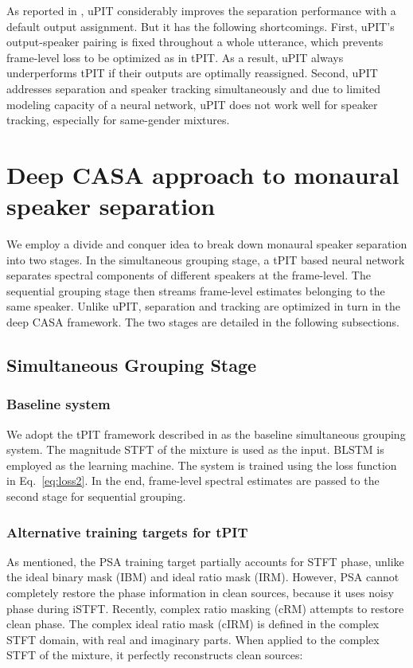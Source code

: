 \documentclass[journal]{IEEEtran}
\begin{document}
As reported in \cite{PIT} \cite{me}, uPIT considerably improves the separation performance with a default output assignment.
But it has the following shortcomings.
First, uPIT's output-speaker pairing is fixed throughout a whole utterance, which prevents frame-level loss to be optimized as in tPIT. As a result, uPIT always underperforms tPIT if their outputs are optimally reassigned. 
Second, uPIT addresses separation and speaker tracking simultaneously and due to limited modeling capacity of a neural network, uPIT does not work well for speaker tracking, especially for same-gender mixtures. 
    

\section{Deep CASA approach to monaural speaker separation}
\label{sec:4}

We employ a divide and conquer idea to break down monaural speaker separation into two stages.
In the simultaneous grouping stage, a tPIT based neural network separates spectral components of different speakers at the frame-level.
The sequential grouping stage then streams frame-level estimates belonging to the same speaker.
Unlike uPIT, separation and tracking are optimized in turn in the deep CASA framework.
The two stages are detailed in the following subsections.

\subsection{Simultaneous Grouping Stage}
\label{sec:4.1}

\subsubsection{Baseline system}
\label{sec:4.1.1}
We adopt the tPIT framework described in \cite{me} as the baseline simultaneous grouping system.
The magnitude STFT of the mixture is used as the input.
BLSTM is employed as the learning machine.
The system is trained using the loss function in Eq.~\ref{eq:loss2}.
In the end, frame-level spectral estimates are passed to the second stage for sequential grouping.

\subsubsection{Alternative training targets for tPIT} 
\label{sec:4.1.2}

As mentioned, the PSA training target partially accounts for STFT phase, unlike the ideal binary mask (IBM) and ideal ratio mask (IRM).
However, PSA cannot completely restore the phase information in clean sources, because it uses noisy phase during iSTFT.
Recently, complex ratio masking \cite{CRM} (cRM) attempts to restore clean phase. 
The complex ideal ratio mask (cIRM) is defined in the complex STFT domain, with real and imaginary parts.
When applied to the complex STFT of the mixture, it perfectly reconstructs clean sources:
\end{document}
